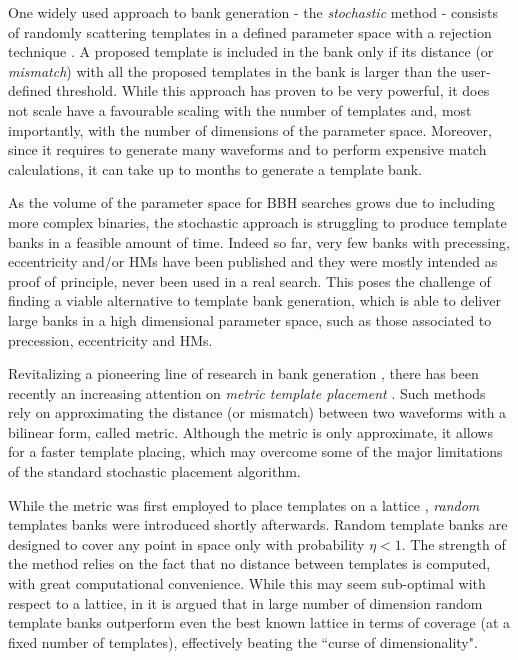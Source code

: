 \documentclass[twocolumn,showpacs,preprintnumbers,nofootinbib,prd,
superscriptaddress,10pt]{revtex4-2}
\begin{document}
One widely used approach to bank generation - the {\it stochastic} method \cite{Harry:2009ea, PhysRevD.80.104014, Ajith:2012mn} - consists of randomly scattering templates in a defined parameter space with a rejection technique \cite{DalCanton:2017ala, Mukherjee:2018yra, Indik:2016qky, Lenon:2021zac}. A proposed template is included in the bank only if its distance (or {\it mismatch}) with all the proposed templates in the bank is larger than the user-defined threshold.
While this approach has proven to be very powerful, it does not scale have a favourable scaling with the number of templates and, most importantly, with the number of dimensions of the parameter space.
Moreover, since it requires to generate many waveforms and to perform expensive match calculations, it can take up to months to generate a template bank.

As the volume of the parameter space for BBH searches grows due to including more complex binaries, the stochastic approach is struggling to produce template banks in a feasible amount of time.
Indeed so far, very few banks with precessing, eccentricity and/or HMs have been published \cite{Harry:2016ijz, Harry:2017weg, McIsaac:2023ijd} and they were  mostly intended as proof of principle, never been used in a real search.
This poses the challenge of finding a viable alternative to template bank generation, which is able to deliver large banks in a high dimensional parameter space, such as those associated to precession, eccentricity and HMs.

Revitalizing a pioneering line of research in bank generation \cite{owen_metric, Messenger:2008ta, Prix:2007ks, Brown:2012qf, Keppel:2013uma}, there has been recently an increasing attention on {\it metric template placement} \cite{Roy:2017oul, 2018cosp...42E2899R, Coogan:2022qxs, Hanna:2022zpk}.
Such methods rely on approximating the distance (or mismatch) between two waveforms with a bilinear form, called metric.
Although the metric is only approximate, it allows for a faster template placing, which may overcome some of the major limitations of the standard stochastic placement algorithm.

While the metric was first employed to place templates on a lattice \cite{owen_metric, Prix:2007ks}, {\it random} templates banks \cite{Messenger:2008ta} were introduced shortly afterwards.
Random template banks are designed to cover any point in space only with probability $\eta<1$.
The strength of the method relies on the fact that no distance between templates is computed, with great computational convenience.
While this may seem sub-optimal with respect to a lattice, in \cite{Messenger:2008ta, Allen:2022lqr, Allen:2021yuy} it is argued that in large number of dimension random template banks outperform even the best known lattice in terms of coverage (at a fixed number of templates), effectively beating the ``curse of dimensionality".
\end{document}
